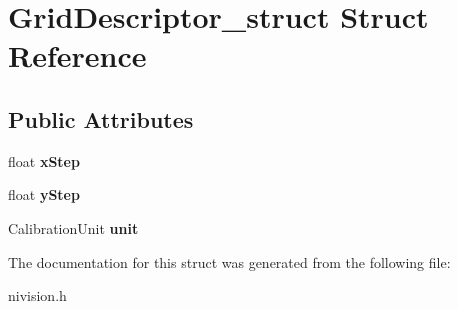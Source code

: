 \hypertarget{structGridDescriptor__struct}{
\section{GridDescriptor\_\-struct Struct Reference}
\label{structGridDescriptor__struct}
}
\subsection*{Public Attributes}
\begin{DoxyCompactItemize}
\item 
\hypertarget{structGridDescriptor__struct_afa63ccaefe7b11e51045f801cd92dd5c}{
float {\bfseries xStep}}
\label{structGridDescriptor__struct_afa63ccaefe7b11e51045f801cd92dd5c}

\item 
\hypertarget{structGridDescriptor__struct_ae9333f8fa28f4d4eb162a39b31b7e1b2}{
float {\bfseries yStep}}
\label{structGridDescriptor__struct_ae9333f8fa28f4d4eb162a39b31b7e1b2}

\item 
\hypertarget{structGridDescriptor__struct_a18e724ae890b8853127c64ced464da85}{
CalibrationUnit {\bfseries unit}}
\label{structGridDescriptor__struct_a18e724ae890b8853127c64ced464da85}

\end{DoxyCompactItemize}


The documentation for this struct was generated from the following file:\begin{DoxyCompactItemize}
\item 
nivision.h\end{DoxyCompactItemize}
